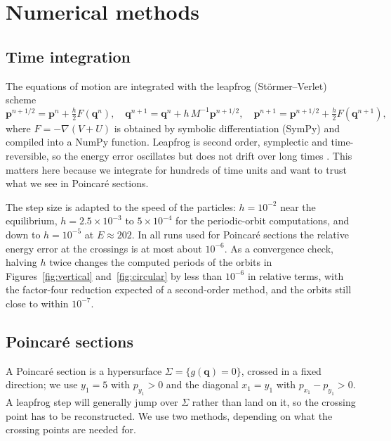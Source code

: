 \documentclass[11pt,a4paper]{article}
\newcommand{\q}{\mathbf{q}}
\newcommand{\p}{\mathbf{p}}
\begin{document}
\section{Numerical methods}\label{sec:methods}

\subsection{Time integration}
The equations of motion are integrated with the leapfrog (St\"ormer--Verlet)
scheme
\begin{equation}\label{eq:leapfrog}
  \p^{n+1/2}=\p^n+\tfrac h2 F(\q^n),\quad
  \q^{n+1}=\q^n+h\,M^{-1}\p^{n+1/2},\quad
  \p^{n+1}=\p^{n+1/2}+\tfrac h2 F(\q^{n+1}),
\end{equation}
where $F=-\nabla(V+U)$ is obtained by symbolic differentiation (SymPy) and
compiled into a NumPy function. Leapfrog is second order, symplectic and
time-reversible, so the energy error oscillates but does not drift over long
times \cite{hairer2006}. This matters here because we integrate for hundreds
of time units and want to trust what we see in Poincar\'e sections.

The step size is adapted to the speed of the particles: $h=10^{-2}$ near the
equilibrium, $h=2.5\times10^{-3}$ to $5\times10^{-4}$ for the periodic-orbit
computations, and down to $h=10^{-5}$ at $E\approx202$. In all runs used for
Poincar\'e sections the relative energy error at the crossings is at most
about $10^{-6}$. As a convergence check, halving $h$ twice changes the computed
periods of the orbits in Figures~\ref{fig:vertical} and~\ref{fig:circular} by
less than $10^{-6}$ in relative terms, with the factor-four reduction expected
of a second-order method, and the orbits still close to within $10^{-7}$.

\subsection{Poincar\'e sections}
A Poincar\'e section is a hypersurface $\Sigma=\{g(\q)=0\}$, crossed in a fixed
direction; we use $y_1=5$ with $p_{y_1}>0$ and the diagonal $x_1=y_1$ with
$p_{x_1}-p_{y_1}>0$. A leapfrog step will generally jump over $\Sigma$ rather
than land on it, so the crossing point has to be reconstructed. We use two
methods, depending on what the crossing points are needed for.
\end{document}
